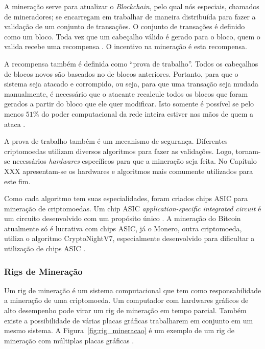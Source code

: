 \documentclass[
article,			%
12pt,				%
openright,			%
oneside,			%
a4paper,			%
chapter=TITLE,		%
section=TITLE,		%
subsection=TITLE,	%
subsubsection=TITLE,%
subsubsubsection=TITLE, %
english,			%
brazil,				%
]{abntex2}
\begin{document}
A mineração serve para atualizar o \emph{Blockchain}, pelo qual nós
especiais, chamados de mineradores; se encarregam em trabalhar de
maneira distribuída para fazer a validação de um conjunto de
transações. O conjunto de transações é definido como um bloco. Toda
vez que um cabeçalho válido é gerado para o bloco, quem o valida
recebe uma recompensa \cite{LChicarino}. O incentivo na mineração é
esta recompensa.

A recompensa também é definida como ``prova de trabalho''. Todos os
cabeçalhos de blocos novos são baseados no de blocos anteriores.
Portanto, para que o sistema seja atacado e corrompido, ou seja, para
que uma transação seja mudada manualmente, é necessário que o atacante
recalcule todos os blocos que foram gerados a partir do bloco que ele
quer modificar. Isto somente é possível se pelo menos $51\%$ do poder
computacional da rede inteira estiver nas mãos de quem a ataca
\cite{Nakamoto2008, Dev2014}.

A prova de trabalho também é um mecanismo de segurança. Diferentes
criptomoedas utilizam diversos algoritmos para fazer as validações.
Logo, tornam-se necessários \emph{hardwares} específicos para que a
mineração seja feita. No Capítulo XXX apresentam-se os hardwares e
algoritmos mais comumente utilizados para este fim.

Como cada algoritmo tem suas especialidades, foram criados chips ASIC
para mineração de criptomoedas. Um chip ASIC
\emph{application-specific integrated circuit} é um circuito
desenvolvido com um propósito único \cite{Smith1997}. A mineração do
Bitcoin atualmente só é lucrativa com chips ASIC\@, já o Monero, outra
criptomoeda, utiliza o algoritmo CryptoNightV7, especialmente
desenvolvido para dificultar a utilização de chips ASIC\@
\cite{NiceHash2018}.

\subsubsection{Rigs de Mineração}

Um rig de mineração é um sistema computacional que tem como
responsabilidade a mineração de uma criptomoeda. Um computador com
hardwares gráficos de alto desempenho pode virar um rig de mineração
em tempo parcial. Também existe a possibilidade de várias placas
gráficas trabalharem em conjunto em um mesmo sistema. A
Figura~\ref{fig:rig_mineracao} é um exemplo de um rig de mineração com
múltiplas placas gráficas \cite{BitcoinWiki2015}.
\end{document}
